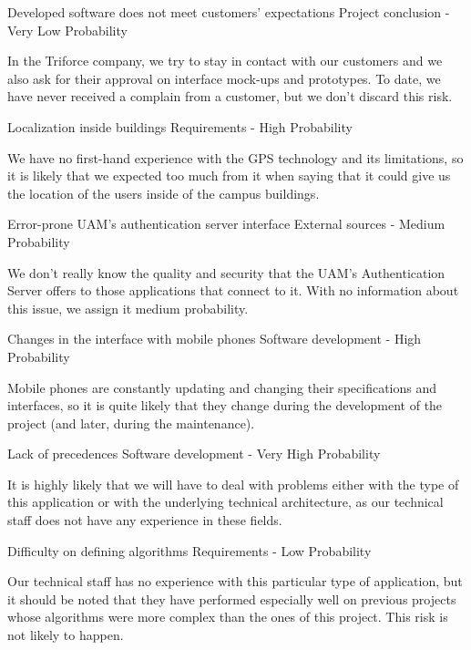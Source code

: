 \begin{risk}{Developed software does not meet customers' expectations}
\riskcat Project conclusion
 - Very Low Probability

In the Triforce company, we try to stay in contact with our customers and we also ask for their approval on interface mock-ups and prototypes. To date, we have never received a complain from a customer, but we don't discard this risk.
\end{risk}

\begin{risk}{Localization inside buildings}
\riskcat Requirements
 - High Probability

We have no first-hand experience with the GPS technology and its limitations, so it is likely that we expected too much from it when saying that it could give us the location of the users inside of the campus buildings.
\end{risk}

\begin{risk}{Error-prone UAM's authentication server interface}
\riskcat External sources
 - Medium Probability

We don't really know the quality and security that the UAM's Authentication Server offers to those applications that connect to it. With no information about this issue, we assign it medium probability.
\end{risk}

\begin{risk}{Changes in the interface with mobile phones}
\riskcat Software development
 - High Probability

Mobile phones are constantly updating and changing their specifications and interfaces, so it is quite likely that they change during the development of the project (and later, during the maintenance).
\end{risk}

\begin{risk}{Lack of precedences}
\riskcat Software development
 - Very High Probability

It is highly likely that we will have to deal with problems either with the type of this application or with the underlying technical architecture, as our technical staff does not have any experience in these fields.
\end{risk}

\begin{risk}{Difficulty on defining algorithms}
\riskcat Requirements
 - Low Probability

Our technical staff has no experience with this particular type of application, but it should be noted that they have performed especially well on previous projects whose algorithms were more complex than the ones of this project. This risk is not likely to happen.
\end{risk}

